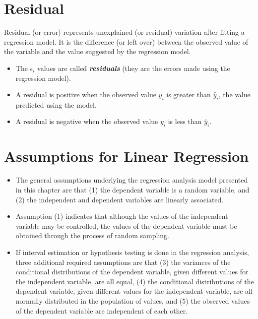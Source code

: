 \documentclass[]{report}
\begin{document}

\section{Residual}
Residual (or error) represents unexplained (or residual) variation after fitting a regression model. 
It is the difference (or left over) between the observed value of the variable and the value suggested by the regression model.



\begin{itemize}
	\item The $\epsilon_i$ values 
	are called \textbf{\emph{residuals}} (they are the errors made using the
	regression model).
	\item A residual is positive when the observed value $y_i$ is greater than
	$\hat{y}_i$, the value predicted using the model.
	\item A residual is negative when the observed value $y_i$ is less than
	$\hat{y}_i$.
\end{itemize}






\section{Assumptions for Linear Regression}
\begin{itemize}
	\item The general assumptions underlying the regression analysis model presented in this chapter are that (1) the
	dependent variable is a random variable, and (2) the independent and dependent variables are linearly
	associated. 
	
	\item	Assumption (1) indicates that although the values of the independent variable may be controlled, the
	values of the dependent variable must be obtained through the process of random sampling.
	
	\item	If interval estimation or hypothesis testing is done in the regression analysis, three additional required assumptions are that (3) the variances of the conditional distributions of the dependent variable, given different
	values for the independent variable, are all equal, (4) the conditional distributions of the dependent variable,
	given different values for the independent variable, are all normally distributed in the population of values, and
	(5) the observed values of the dependent variable are independent of each other.
\end{itemize}
\end{document}
